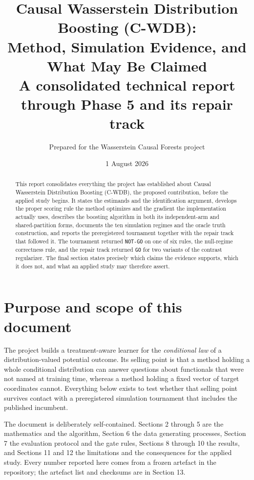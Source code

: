 \documentclass[11pt,a4paper]{article}
\title{Causal Wasserstein Distribution Boosting (C-WDB):\\
Method, Simulation Evidence, and What May Be Claimed\\
\large A consolidated technical report through Phase 5 and its repair track}
\author{Prepared for the Wasserstein Causal Forests project}
\date{1 August 2026}
\theoremstyle{definition}
\theoremstyle{remark}
\newcommand{\CWDB}{\textsf{C-WDB}}
\begin{document}
\maketitle

\begin{abstract}
This report consolidates everything the project has established about Causal
Wasserstein Distribution Boosting (\CWDB), the proposed contribution, before the
applied study begins. It states the estimands and the identification argument,
develops the proper scoring rule the method optimizes and the gradient the
implementation actually uses, describes the boosting algorithm in both its
independent-arm and shared-partition forms, documents the ten simulation regimes
and the oracle truth construction, and reports the preregistered tournament
together with the repair track that followed it. The tournament returned
\texttt{NOT-GO} on one of six rules, the null-regime correctness rule, and the
repair track returned \texttt{GO} for two variants of the contrast regularizer.
The final section states precisely which claims the evidence supports, which it
does not, and what an applied study may therefore assert.
\end{abstract}

\tableofcontents

\section{Purpose and scope of this document}

The project builds a treatment-aware learner for the \emph{conditional law} of a
distribution-valued potential outcome. Its selling point is that a method
holding a whole conditional distribution can answer questions about functionals
that were not named at training time, whereas a method holding a fixed vector of
target coordinates cannot. Everything below exists to test whether that selling
point survives contact with a preregistered simulation tournament that includes
the published incumbent.

The document is deliberately self-contained. Sections 2 through 5 are the
mathematics and the algorithm, Section 6 the data generating processes, Section 7
the evaluation protocol and the gate rules, Sections 8 through 10 the results,
and Sections 11 and 12 the limitations and the consequences for the applied
study. Every number reported here comes from a frozen artefact in the
repository; the artefact list and checksums are in Section 13.
\end{document}
